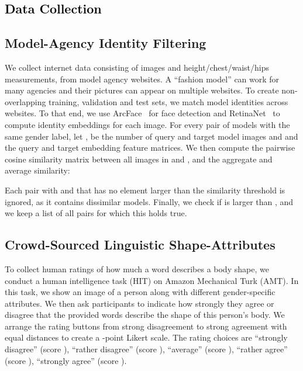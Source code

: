 \documentclass[10pt,twocolumn,letterpaper]{article}
\newcommand{\retinanet}{\mbox{RetinaNet}\xspace}
\newcommand{\arcface}{\mbox{ArcFace}\xspace}
\newcommand{\amt}{\mbox{AMT}\xspace}
\newcommand{\cameraready}[1]{\textcolor{Fuchsia}{{#1}}\xspace}
\renewcommand{\cameraready}[1]{\textcolor{black}{{#1}}\xspace}
\begin{document}
\begin{appendices}
    \renewcommand{\thefigure}{A.\arabic{figure}}
    \setcounter{figure}{0}
    \renewcommand{\thetable}{A.\arabic{table}}
    \setcounter{table}{0}

    







\section{\cameraready{Data Collection}}
\subsection{Model-Agency Identity Filtering}
\label{supmat:sec:model_images}

We collect internet data consisting of images and height/chest/waist/hips measurements, from model agency websites.
A ``fashion model'' can work for many agencies and their pictures can appear on multiple websites.
To create non-overlapping training, validation and test sets, we match model identities across websites.
To that end, we use \arcface~\cite{deng2018arcface} for face detection and \retinanet~\cite{Deng_2020_CVPR} to compute identity embeddings  for each image.
For every pair of models  with the same gender label, let ,  be the number of query and target model images and  and  the query and target embedding feature matrices.
We then compute the pairwise cosine similarity matrix  between all images in  and , and the aggregate and average similarity:

Each pair with  and  that has no element larger than the similarity threshold  is ignored, as it contains dissimilar models.
Finally, we check if  is larger than , and we keep a list of all pairs for which this holds true.
 \subsection{Crowd-Sourced Linguistic Shape-Attributes}
To collect human ratings of how much a word describes a body shape, we conduct a
human intelligence task (HIT)
on Amazon Mechanical Turk (\amt). 
In this task, we show an image of a person along with  different gender-specific attributes. 
We then ask participants to indicate how strongly they agree or disagree that the provided words describe the shape of this person's body. 
We arrange the rating buttons from strong disagreement to strong agreement with equal distances to create a -point Likert scale. 
The rating choices are ``strongly disagree'' (score ), ``rather disagree'' (score ), ``average'' (score ), ``rather agree'' (score ), ``strongly agree'' (score ). 



\end{appendices}
\end{document}

